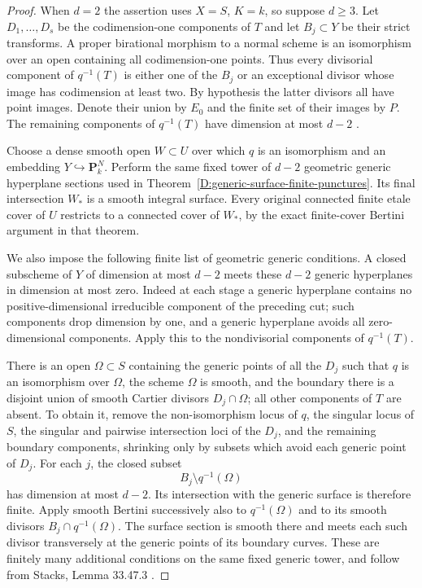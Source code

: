\begin{proof}
When $d=2$ the assertion uses $X=S$, $K=k$, so suppose $d\ge3$.
Let $D_1,\ldots,D_s$ be the codimension-one components of $T$ and
let $B_j\subset Y$ be their strict transforms. A proper birational
morphism to a normal scheme is an isomorphism over an open containing
all codimension-one points. Thus every divisorial component of
$q^{-1}(T)$ is either one of the $B_j$ or an exceptional divisor whose
image has codimension at least two. By hypothesis the latter divisors
all have point images. Denote their union by $E_0$ and the finite set
of their images by $P$. The remaining components of $q^{-1}(T)$ have
dimension at most $d-2$
\citep[Tag 0BFP, Lemma 33.17.3 and proof]{StacksDControlledBoundary}.

Choose a dense smooth open $W\subset U$ over which $q$ is an
isomorphism and an embedding $Y\hookrightarrow\mathbf P^N_k$.
Perform the same fixed tower of $d-2$ geometric generic hyperplane
sections used in Theorem~\ref{D:generic-surface-finite-punctures}.
Its final intersection $W_*$ is a smooth integral surface. Every
original connected finite etale cover of $U$ restricts to a connected
cover of $W_*$, by the exact finite-cover Bertini argument in that
theorem.

We also impose the following finite list of geometric generic
conditions. A closed subscheme of $Y$ of dimension at most $d-2$
meets these $d-2$ generic hyperplanes in dimension at most zero.
Indeed at each stage a generic hyperplane contains no
positive-dimensional irreducible component of the preceding cut;
such components drop dimension by one, and a generic hyperplane
avoids all zero-dimensional components. Apply this to the
nondivisorial components of $q^{-1}(T)$.

There is an open $\Omega\subset S$ containing the generic points of
all the $D_j$ such that $q$ is an isomorphism over $\Omega$, the scheme
$\Omega$ is smooth, and the boundary there is a disjoint union of
smooth Cartier divisors $D_j\cap\Omega$; all other components of $T$
are absent. To obtain it, remove the non-isomorphism locus of $q$,
the singular locus of $S$, the singular and pairwise intersection
loci of the $D_j$, and the remaining boundary components, shrinking
only by subsets which avoid each generic point of $D_j$.
For each $j$, the closed subset
\[
                         B_j\setminus q^{-1}(\Omega)
\]
has dimension at most $d-2$. Its intersection with the generic surface
is therefore finite. Apply smooth Bertini successively also to
$q^{-1}(\Omega)$ and to its smooth divisors $B_j\cap q^{-1}(\Omega)$.
The surface section is smooth there and meets each such divisor
transversely at the generic points of its boundary curves. These are
finitely many additional conditions on the same fixed generic tower,
and follow from Stacks, Lemma 33.47.3
\citep[Tag 0FD6]{StacksDGenericSurface}.


\end{proof}
